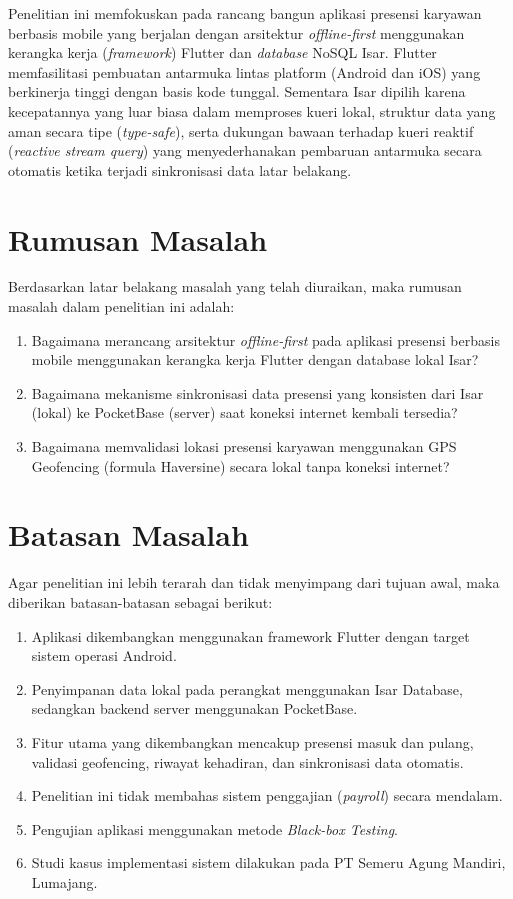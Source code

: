 Penelitian ini memfokuskan pada rancang bangun aplikasi presensi karyawan berbasis mobile yang berjalan dengan arsitektur \textit{offline-first} menggunakan kerangka kerja (\textit{framework}) Flutter dan \textit{database} NoSQL Isar. Flutter memfasilitasi pembuatan antarmuka lintas platform (Android dan iOS) yang berkinerja tinggi dengan basis kode tunggal. Sementara Isar dipilih karena kecepatannya yang luar biasa dalam memproses kueri lokal, struktur data yang aman secara tipe (\textit{type-safe}), serta dukungan bawaan terhadap kueri reaktif (\textit{reactive stream query}) yang menyederhanakan pembaruan antarmuka secara otomatis ketika terjadi sinkronisasi data latar belakang.

\section{Rumusan Masalah}
Berdasarkan latar belakang masalah yang telah diuraikan, maka rumusan masalah dalam penelitian ini adalah:
\begin{enumerate}
    \item Bagaimana merancang arsitektur \textit{offline-first} pada aplikasi presensi berbasis mobile menggunakan kerangka kerja Flutter dengan database lokal Isar?
    \item Bagaimana mekanisme sinkronisasi data presensi yang konsisten dari Isar (lokal) ke PocketBase (server) saat koneksi internet kembali tersedia?
    \item Bagaimana memvalidasi lokasi presensi karyawan menggunakan GPS Geofencing (formula Haversine) secara lokal tanpa koneksi internet?
\end{enumerate}

\section{Batasan Masalah}
Agar penelitian ini lebih terarah dan tidak menyimpang dari tujuan awal, maka diberikan batasan-batasan sebagai berikut:
\begin{enumerate}
    \item Aplikasi dikembangkan menggunakan framework Flutter dengan target sistem operasi Android.
    \item Penyimpanan data lokal pada perangkat menggunakan Isar Database, sedangkan backend server menggunakan PocketBase.
    \item Fitur utama yang dikembangkan mencakup presensi masuk dan pulang, validasi geofencing, riwayat kehadiran, dan sinkronisasi data otomatis.
    \item Penelitian ini tidak membahas sistem penggajian (\textit{payroll}) secara mendalam.
    \item Pengujian aplikasi menggunakan metode \textit{Black-box Testing}.
    \item Studi kasus implementasi sistem dilakukan pada PT Semeru Agung Mandiri, Lumajang.
\end{enumerate}

